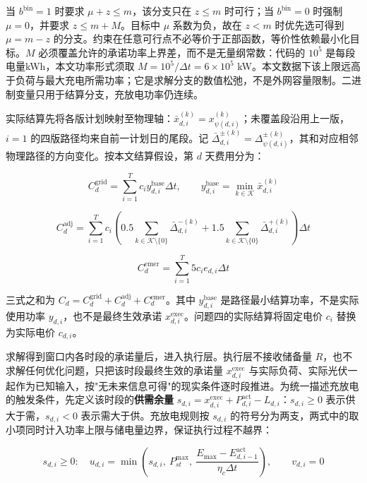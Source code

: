 \documentclass[12pt,a4paper]{ctexart}
\begin{document}
当 $b^{\mathrm{bin}}=1$ 时要求 $\mu+z\le m$，该分支只在 $z\le m$ 时可行；当 $b^{\mathrm{bin}}=0$ 时强制 $\mu=0$，并要求 $z\le m+M$。目标中 $\mu$ 系数为负，故在 $z<m$ 时优先选可得到 $\mu=m-z$ 的分支。约束在任意可行点不必等价于正部函数，等价性依赖最小化目标。$M$ 必须覆盖允许的承诺功率上界差，而不是无量纲常数：代码的 $10^5$ 是每段电量kWh，本文功率形式须取 $M=10^5/\Delta t=6\times10^5$ kW。本文数据下该上限远高于负荷与最大充电所需功率；它是求解分支的数值松弛，不是外网容量限制。二进制变量只用于结算分支，充放电功率仍连续。

实际结算先将各版计划映射至物理轴：$\bar x_{d,i}^{(k)}=x_{\psi(d,i)}^{(k)}$；未覆盖段沿用上一版，$i=1$ 的四版路径均来自前一计划日的尾段。记 $\bar\Delta_{d,i}^{\pm(k)}=\Delta_{\psi(d,i)}^{\pm(k)}$，其和对应相邻物理路径的方向变化。按本文结算假设，第 $d$ 天费用分为：

\begin{equation}
C_d^{\mathrm{grid}}=\sum_{i=1}^{T}c_i y_{d,i}^{\mathrm{base}}\Delta t,\qquad y_{d,i}^{\mathrm{base}}=\min_{k\in\mathcal K}\bar x_{d,i}^{(k)}
\end{equation}

\begin{equation}
C_d^{\mathrm{adj}}=\sum_{i=1}^{T}c_i\left(0.5\sum_{k\in\mathcal K\setminus\{0\}}\bar\Delta_{d,i}^{-(k)}+1.5\sum_{k\in\mathcal K\setminus\{0\}}\bar\Delta_{d,i}^{+(k)}\right)\Delta t
\end{equation}

\begin{equation}
C_d^{\mathrm{emer}}=\sum_{i=1}^{T}5c_i e_{d,i}\Delta t
\end{equation}

三式之和为 $C_d=C_d^{\mathrm{grid}}+C_d^{\mathrm{adj}}+C_d^{\mathrm{emer}}$。其中 $y_{d,i}^{\mathrm{base}}$ 是路径最小结算功率，不是实际使用功率 $y_{d,i}$，也不是最终生效承诺 $x_{d,i}^{\mathrm{exec}}$。问题四的实际结算将固定电价 $c_i$ 替换为实际电价 $c_{d,i}$。

求解得到窗口内各时段的承诺量后，进入执行层。执行层不接收储备量 $R$，也不求解任何优化问题，只把该时段最终生效的承诺量 $x_{d,i}^{\mathrm{exec}}$ 与实际负荷、实际光伏一起作为已知输入，按"无未来信息可得"的现实条件逐时段推进。为统一描述充放电的触发条件，先定义该时段的\textbf{供需余量} $s_{d,i}=x_{d,i}^{\mathrm{exec}}+P_{d,i}^{\mathrm{act}}-L_{d,i}$：$s_{d,i}\ge0$ 表示供大于需，$s_{d,i}<0$ 表示需大于供。充放电规则按 $s_{d,i}$ 的符号分为两支，两式中的取小项同时计入功率上限与储电量边界，保证执行过程不越界：

\begin{equation}
s_{d,i}\ge0:\quad u_{d,i}=\min\left(s_{d,i},\ P_{st}^{\max},\ \frac{E_{\max}-E_{d,i-1}^{\mathrm{act}}}{\eta_c\Delta t}\right),\qquad v_{d,i}=0
\end{equation}
\end{document}
